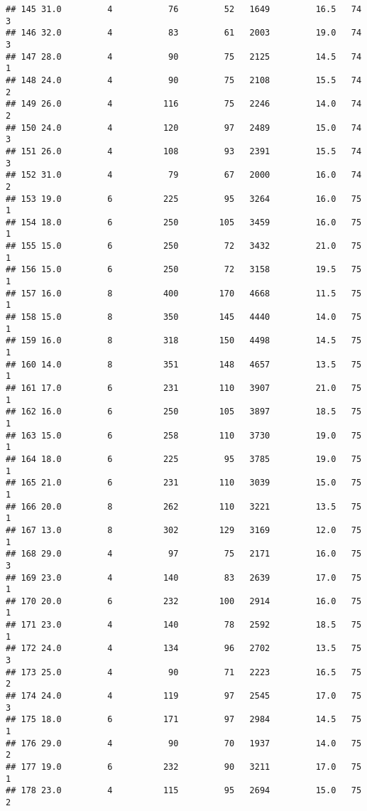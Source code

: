 \documentclass[
]{article}
\begin{document}
\begin{verbatim}
## 145 31.0         4           76         52   1649         16.5   74      3
## 146 32.0         4           83         61   2003         19.0   74      3
## 147 28.0         4           90         75   2125         14.5   74      1
## 148 24.0         4           90         75   2108         15.5   74      2
## 149 26.0         4          116         75   2246         14.0   74      2
## 150 24.0         4          120         97   2489         15.0   74      3
## 151 26.0         4          108         93   2391         15.5   74      3
## 152 31.0         4           79         67   2000         16.0   74      2
## 153 19.0         6          225         95   3264         16.0   75      1
## 154 18.0         6          250        105   3459         16.0   75      1
## 155 15.0         6          250         72   3432         21.0   75      1
## 156 15.0         6          250         72   3158         19.5   75      1
## 157 16.0         8          400        170   4668         11.5   75      1
## 158 15.0         8          350        145   4440         14.0   75      1
## 159 16.0         8          318        150   4498         14.5   75      1
## 160 14.0         8          351        148   4657         13.5   75      1
## 161 17.0         6          231        110   3907         21.0   75      1
## 162 16.0         6          250        105   3897         18.5   75      1
## 163 15.0         6          258        110   3730         19.0   75      1
## 164 18.0         6          225         95   3785         19.0   75      1
## 165 21.0         6          231        110   3039         15.0   75      1
## 166 20.0         8          262        110   3221         13.5   75      1
## 167 13.0         8          302        129   3169         12.0   75      1
## 168 29.0         4           97         75   2171         16.0   75      3
## 169 23.0         4          140         83   2639         17.0   75      1
## 170 20.0         6          232        100   2914         16.0   75      1
## 171 23.0         4          140         78   2592         18.5   75      1
## 172 24.0         4          134         96   2702         13.5   75      3
## 173 25.0         4           90         71   2223         16.5   75      2
## 174 24.0         4          119         97   2545         17.0   75      3
## 175 18.0         6          171         97   2984         14.5   75      1
## 176 29.0         4           90         70   1937         14.0   75      2
## 177 19.0         6          232         90   3211         17.0   75      1
## 178 23.0         4          115         95   2694         15.0   75      2

\end{verbatim}
\end{document}
